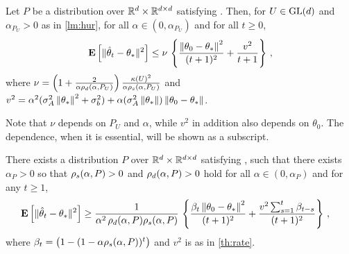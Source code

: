 \begin{theorem}\label{th:rate}
Let $P$ be a distribution over $\mathbb{R}^d\times \mathbb{R}^{d \times d}$ satisfying .
Then, for  $U\in\mathrm{GL}(d)$ and $\alpha_{P_U}>0$ as in \cref{lm:hur},
for all $\alpha\in (0,\alpha_{P_U})$ and for all $t\ge 0$,
\begin{align*}
\mathbf{E}\left[\| \hat{\theta}_t-\theta_*\|^2\right]
\leq
\nu\,
\left\{\frac{\left\| \theta_0-\theta_*\right\|^2}{(t+1)^2}+ \frac{v^2}{t+1} \right\}\,,
\end{align*}
where $\nu = \left(1+\tfrac2{\alpha\rho_d(\alpha,P_U)}\right)\tfrac{\kappa(U)^2}{\alpha \rho_s(\alpha,P_U)}$ and
$v^2 = 
\alpha^2(\sigma_A^2\left\| \theta_*\right\|^2+\sigma_b^2)+\alpha (\sigma_A^2\left\| \theta_*\right\|)\left\| \theta_0-\theta_*\right\|$.
\end{theorem}
Note that $\nu$ depends on $P_U$ and $\alpha$, while $v^2$ in addition also depends on $\theta_0$. The dependence,  when it is essential, will be shown as a subscript.
\begin{theorem}\label{th:lb}
There exists a distribution $P$ over $\mathbb{R}^d\times \mathbb{R}^{d \times d}$ satisfying , such that
there exists $\alpha_P>0$ so that $\rho_s(\alpha,P)>0$ and $\rho_d(\alpha,P)>0$ hold for all $\alpha\in (0,\alpha_P)$ and
for any $t\ge 1$, 
\begin{align*}
\mathbf{E}\left[\| \hat{\theta}_t-\theta_*\|^2\right] 
&\geq \frac{1}{\alpha^2 \, \rho_d(\alpha,P)\rho_s(\alpha,P)} \,\left\{ \frac{\beta_t \left\| \theta_0-\theta_*\right\|^2}{(t+1)^2} 
+ \frac{v^2\sum_{s=1}^t \beta_{t-s}  }{(t+1)^2} \right\}\,,
\end{align*}
where $\beta_{t} =  \big(1-(1-\alpha \rho_s(\alpha,P))^t\big)$ and $v^2$ is as in \cref{th:rate}.
\begin{comment}
\begin{align}
\frac{1}{(t+1)^2}(\alpha \lambda_{\min})^{-2}(1-\alpha \lambda_{\min}^t) \theta^2_0(1)\leq \norm{\eh_t}^2\leq
\frac{1}{(t+1)^2} \left(\alpha^{-1}\rhos{P^0}+\alpha^{-2}\rhos{P^0}^2\right)\norm{\theta_0}^2
\end{align}
\end{comment}
\end{theorem}
